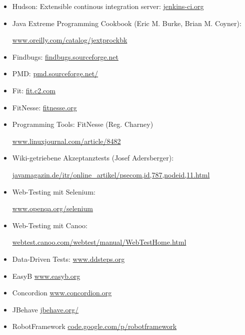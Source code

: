 \begin{itemize}
\item Hudson: Extensible continous integration server:
\href{http://jenkins-ci.org}{jenkins-ci.org}
%
\item Java Extreme Programming Cookbook (Eric M. Burke, Brian M. Coyner):

  \href{http://www.oreilly.com/catalog/jextprockbk}
      {www.oreilly.com/catalog/jextprockbk}
%
\item Findbugs:
  \href{http://findbugs.sourceforge.net}{findbugs.sourceforge.net}
\item PMD:
  \href{http://pmd.sourceforge.net/}{pmd.sourceforge.net/}
\item Fit: \href{http://fit.c2.com}{fit.c2.com}
\item FitNesse: \href{http://fitnesse.org}{fitnesse.org}
\item Programming Tools: FitNesse (Reg. Charney)

\href{http://www.linuxjournal.com/article/8482}
    {www.linuxjournal.com/article/8482}
\item Wiki-getriebene Akzeptanztests (Josef Adersberger):

\href{http://javamagazin.de/itr/online_artikel/psecom,id,787,nodeid,11.html}
     {javamagazin.de/itr/online\_artikel/psecom,id,787,nodeid,11.html}

%

\item Web-Testing mit Selenium:

\href{http://www.openqa.org/selenium}{www.openqa.org/selenium}
%
\item Web-Testing mit Canoo:

\href{http://webtest.canoo.com/webtest/manual/WebTestHome.html}
{webtest.canoo.com/webtest/manual/WebTestHome.html}

\item Data-Driven Tests:
  \href{http://www.ddsteps.org}{www.ddsteps.org}
\item EasyB \href{http://www.easyb.org}{www.easyb.org}
\item Concordion \href{http://www.concordion.org}{www.concordion.org}
\item JBehave \href{http://jbehave.org/}{jbehave.org/}
\item RobotFramework \href{http://code.google.com/p/robotframework}{code.google.com/p/robotframework}
\end{itemize}
%
%
%
